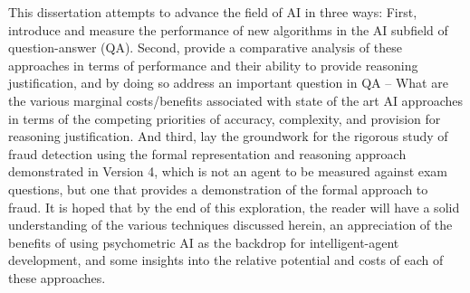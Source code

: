 This dissertation attempts to advance the field of AI in three ways:  First, introduce and measure the performance of new algorithms in the AI subfield of question-answer (QA).  Second, provide a comparative analysis of these approaches in terms of performance and their ability to provide reasoning justification, and by doing so address an important question in QA -- What are the various marginal costs/benefits associated with state of the art AI approaches in terms of the competing priorities of accuracy, complexity, and provision for reasoning justification.  And third, lay the groundwork for the rigorous study of fraud detection using the formal representation and reasoning approach demonstrated in Version 4, which is not an agent to be measured against exam questions, but one that provides a demonstration of the formal approach to fraud.  It is hoped that by the end of this exploration, the reader will have a solid understanding of the various techniques discussed herein, an appreciation of the benefits of using psychometric AI as the backdrop for intelligent-agent development, and some insights into the relative potential and costs of each of these approaches.